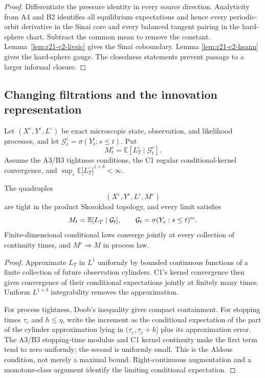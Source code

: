 \begin{proof}
Differentiate the pressure identity in every source direction.  Analyticity
from A4 and B2 identifies all equilibrium expectations and hence every
periodic-orbit derivative in the Sinai core and every balanced tangent pairing
in the hard-sphere chart.  Subtract the common mean to remove the constant.
Lemma~\ref{lem:r21-c2-livsic} gives the Sinai coboundary.  Lemma
\ref{lem:r21-c2-hsann} gives the hard-sphere gauge.  The closedness statements
prevent passage to a larger informal closure.
\end{proof}

\subsection{Changing filtrations and the innovation representation}

Let $(X^\varepsilon,Y^\varepsilon,L^\varepsilon)$ be exact microscopic
state, observation, and likelihood processes, and let
$\mathcal G_t^\varepsilon=\sigma(Y_s^\varepsilon:s\le t)$.  Put
\[
 M_t^\varepsilon=\mathbb E[L_T^\varepsilon\mid\mathcal G_t^\varepsilon].
\]
Assume the A3/B3 tightness conditions, the C1 regular conditional-kernel
convergence, and
$\sup_\varepsilon\mathbb E|L_T^\varepsilon|^{1+\delta}<\infty$.

\begin{theorem}
\label{thm:r21-c2-optional}
The quadruples
\[
 (X^\varepsilon,Y^\varepsilon,L^\varepsilon,M^\varepsilon)
\]
are tight in the product Skorokhod topology, and every limit satisfies
\[
 M_t=\mathbb E[L_T\mid\mathcal G_t],
 \qquad \mathcal G_t=\sigma(Y_s:s\le t)^{\rm rc}.
\]
Finite-dimensional conditional laws converge jointly at every collection of
continuity times, and $M^\varepsilon\Rightarrow M$ in process law.
\end{theorem}

\begin{proof}
Approximate $L_T$ in $L^1$ uniformly by bounded continuous functions of a
finite collection of future observation cylinders.  C1's kernel convergence
then gives convergence of their conditional expectations jointly at finitely
many times.  Uniform $L^{1+\delta}$ integrability removes the approximation.

For process tightness, Doob's inequality gives compact containment.  For
stopping times $\tau_\varepsilon$ and $h\le\eta$, write the increment as the
conditional expectation of the part of the cylinder approximation lying in
$(\tau_\varepsilon,\tau_\varepsilon+h]$ plus its approximation error.  The
A3/B3 stopping-time modulus and C1 kernel continuity make the first term tend
to zero uniformly; the second is uniformly small.  This is the Aldous
condition, not merely a maximal bound.  Right-continuous augmentation and a
monotone-class argument identify the limiting conditional expectation.
\end{proof}

